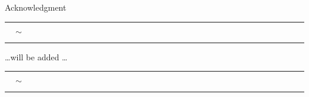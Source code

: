 \documentclass[../main.tex]{subfile}
\begin{document}
\thispagestyle{empty}
\vspace*{24pt}
\begin{center}
    \LARGE Acknowledgment \normalsize\\
    \rule[3pt]{0.04\textwidth}{0.2pt} $\quad\sim\quad$\rule[3pt]{.04\textwidth}{0.2pt} 
\end{center}
\vspace*{36pt}


\dots will be added \dots
\begin{center}
    \rule{0.1\textwidth}{0.2pt} $\quad\sim\quad$\rule{0.1\textwidth}{0.2pt} 
\end{center}
\end{document}
